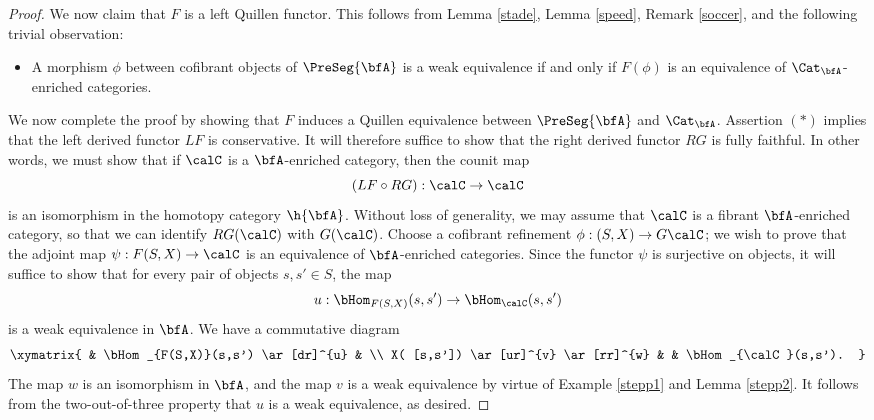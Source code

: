 \begin{proof}
We now claim that $F$ is a left Quillen functor. This follows from Lemma \ref{stade}, Lemma \ref{speed}, Remark \ref{soccer}, and the following trivial observation:
\begin{itemize}
\item[$(\ast)$] A morphism $\phi$ between cofibrant objects of $\PreSeg{\bfA}$ is a weak equivalence if and only if $F(\phi)$ is an equivalence of $\Cat_{\bfA}$-enriched categories.
\end{itemize}
We now complete the proof by showing that $F$ induces a Quillen equivalence between
$\PreSeg{\bfA}$ and $\Cat_{\bfA}$. Assertion $(\ast)$ implies that the left derived functor $LF$
is conservative. It will therefore suffice to show that the right derived functor $RG$ is fully faithful.
In other words, we must show that if $\calC$ is a $\bfA$-enriched category, then the counit map
$$ (LF \circ RG): \calC \rightarrow \calC$$
is an isomorphism in the homotopy category $\h{\bfA}$. Without loss of generality, we may assume that $\calC$ is a fibrant $\bfA$-enriched category, so that we can identify $RG(\calC)$ with $G(\calC)$.
Choose a cofibrant refinement $\phi: (S,X) \rightarrow G\calC$; we wish to prove that the adjoint map
$\psi: F(S,X) \rightarrow \calC$ is an equivalence of $\bfA$-enriched categories. Since the functor
$\psi$ is surjective on objects, it will suffice to show that for every pair of objects $s,s' \in S$, the map
$$u: \bHom_{F(S,X)}( s, s' ) \rightarrow \bHom_{\calC}(s,s')$$
is a weak equivalence in $\bfA$. We have a commutative diagram
$$ \xymatrix{ & \bHom_{F(S,X)}(s,s') \ar[dr]^{u} & \\
X( [s,s']) \ar[ur]^{v} \ar[rr]^{w} & & \bHom_{\calC}(s,s'). }$$
The map $w$ is an isomorphism in $\bfA$, and the map $v$ is a weak equivalence by
virtue of Example \ref{stepp1} and Lemma \ref{stepp2}. It follows from the two-out-of-three property that
$u$ is a weak equivalence, as desired.
\end{proof}

